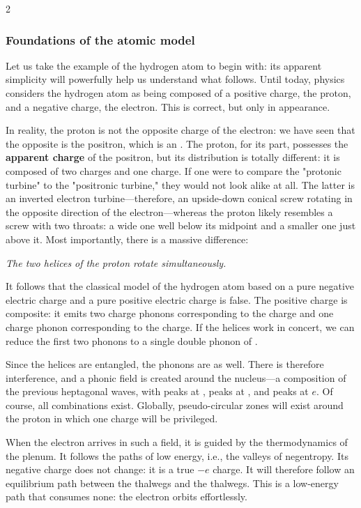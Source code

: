 \begin{multicols}{2}
	\subsubsection{Foundations of the atomic model}
	
	Let us take the example of the hydrogen atom to begin with: its apparent simplicity will powerfully help us understand what follows. Until today, physics considers the hydrogen atom as being composed of a positive charge, the proton, and a negative charge, the electron. This is correct, but only in appearance.
	
	In reality, the proton is not the opposite charge of the electron: we have seen that the opposite is the positron, which is an . The proton, for its part, possesses the \textbf{apparent charge} of the positron, but its distribution is totally different: it is composed of two  charges and one  charge. If one were to compare the "protonic turbine" to the "positronic turbine," they would not look alike at all. The latter is an inverted electron turbine—therefore, an upside-down conical screw rotating in the opposite direction of the electron—whereas the proton likely resembles a screw with two throats: a wide one well below its midpoint and a smaller one just above it. Most importantly, there is a massive difference:
	
	\textit{The two helices of the proton rotate simultaneously.}
	
	It follows that the classical model of the hydrogen atom based on a pure negative electric charge and a pure positive electric charge is false. The positive charge is composite: it emits two charge phonons corresponding to the  charge and one charge phonon corresponding to the  charge. If the  helices work in concert, we can reduce the first two phonons to a single double phonon of .
	
	Since the helices are entangled, the phonons are as well. There is therefore interference, and a phonic field is created around the nucleus—a composition of the previous heptagonal waves, with peaks at , peaks at , and peaks at $e$. Of course, all combinations exist. Globally, pseudo-circular zones will exist around the proton in which one charge will be privileged.
	
	When the electron arrives in such a field, it is guided by the thermodynamics of the plenum. It follows the paths of low energy, i.e., the valleys of negentropy. Its negative charge does not change: it is a true $-e$ charge. It will therefore follow an equilibrium path between the  thalwegs and the  thalwegs. This is a low-energy path that consumes none: the electron orbits effortlessly.
	

\end{multicols}
